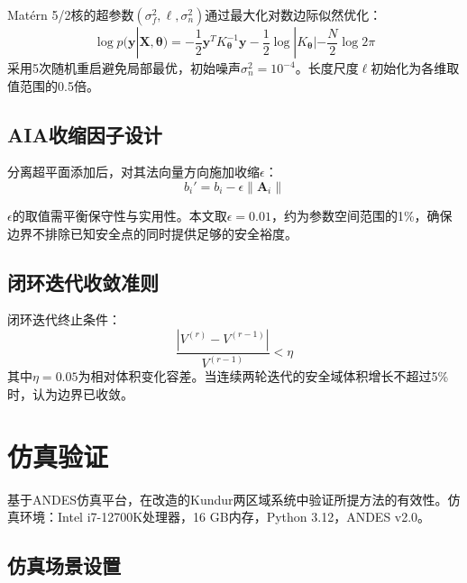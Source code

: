 \documentclass[a4paper,11pt]{ctexart}
\newcommand{\bA}{\mathbf{A}}
\begin{document}
Matérn 5/2核的超参数$(\sigma_f^2, \ell, \sigma_n^2)$通过最大化对数边际似然优化：
\begin{equation}
    \log p(\mathbf{y} | \mathbf{X}, \boldsymbol{\theta}) = -\frac{1}{2}\mathbf{y}^T K_{\boldsymbol{\theta}}^{-1}\mathbf{y} - \frac{1}{2}\log|K_{\boldsymbol{\theta}}| - \frac{N}{2}\log 2\pi
    \label{eq:marginal_likelihood}
\end{equation}
采用5次随机重启避免局部最优，初始噪声$\sigma_n^2 = 10^{-4}$。长度尺度$\ell$初始化为各维取值范围的0.5倍。

\subsection{AIA收缩因子设计}

分离超平面添加后，对其法向量方向施加收缩$\epsilon$：
\begin{equation}
    b_i' = b_i - \epsilon \|\bA_i\|
    \label{eq:shrinkage}
\end{equation}

$\epsilon$的取值需平衡保守性与实用性。本文取$\epsilon = 0.01$，约为参数空间范围的1\%，确保边界不排除已知安全点的同时提供足够的安全裕度。

\subsection{闭环迭代收敛准则}

闭环迭代终止条件：
\begin{equation}
    \frac{|V^{(r)} - V^{(r-1)}|}{V^{(r-1)}} < \eta
    \label{eq:terminate}
\end{equation}
其中$\eta = 0.05$为相对体积变化容差。当连续两轮迭代的安全域体积增长不超过5\%时，认为边界已收敛。

\section{仿真验证}
\label{sec:simulation}

基于ANDES仿真平台，在改造的Kundur两区域系统中验证所提方法的有效性。仿真环境：Intel i7-12700K处理器，16 GB内存，Python 3.12，ANDES v2.0。

\subsection{仿真场景设置}
\FloatBarrier
\end{document}
